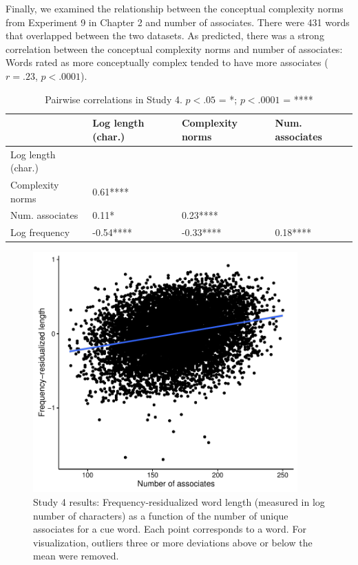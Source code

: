 Finally, we examined the relationship between the conceptual complexity norms from  Experiment 9 in Chapter 2  and number of associates. There were 431 words that overlapped between the two datasets. As predicted, there was a strong correlation between the conceptual complexity norms and number of associates: Words rated as more conceptually complex tended to have more associates ($r = .23$, $p< .0001$).


\begin{table}[t!]
\centering
\begin{tabular}{llll}
  \hline
 & Log length (char.)  & Complexity norms &   Num. associates  \\ 
  \hline
Log length (char.) &  &  &  \\ 
Complexity norms  &  0.61**** &  &  \\ 
Num. associates &  0.11*    &  0.23**** &  \\ 
Log frequency& -0.54**** & -0.33**** &  0.18**** \\ 
   \hline
\end{tabular}
\caption{Pairwise correlations in Study 4. $p<.05$ = *; $p<.0001$ = ****}
\label{study4corr}
\end{table}

  \begin{figure}[t!]
 \begin{center}
  \includegraphics[width=4in]{figs/associate_plot.pdf}
  \caption{\label{fig:associate_plot} Study 4 results: Frequency-residualized word length (measured in log number of characters) as a function of the number of unique associates for a cue word. Each point corresponds to a word. For visualization, outliers three or more deviations above or below the mean were removed.}
 \end{center}
\end{figure} 

